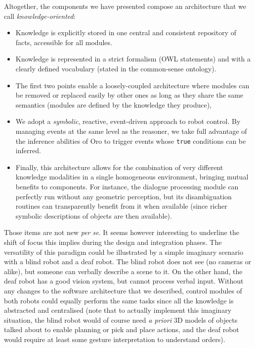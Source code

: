 \documentclass[preprint,12pt]{elsarticle}
\begin{document}
Altogether, the components we have presented compose an architecture that we
call \emph{knowledge-oriented}:

\begin{itemize}
    
    \item{Knowledge is explicitly stored in one central and consistent
    repository of facts, accessible for all modules.} 

    \item{Knowledge is represented in a strict formalism (OWL statements) and
    with a clearly defined vocabulary (stated in the common-sense ontology).}

    \item{The first two points enable a loosely-coupled architecture where
    modules can be removed or replaced easily by other ones as long as
    they share the same semantics (modules are defined by the knowledge they
    produce),} 

    \item{We adopt a \emph{symbolic}, reactive, event-driven approach to robot control.
    By managing events at the same level as the reasoner, we take full
    advantage of the inference abilities of {\sc Oro} to trigger events whose
    \texttt{true} conditions can be inferred.} 

    \item{Finally, this architecture allows for the combination of very
    different knowledge modalities in a single homogeneous environment,
    bringing mutual benefits to components. For instance, the dialogue
    processing module can perfectly run without any geometric
    perception, but its disambiguation routines can transparently
    benefit from it when available (since richer symbolic descriptions of
    objects are then available).}

\end{itemize}

Those items are not new \emph{per se}. It seems however interesting to
underline the shift of focus this implies during the design and integration
phases. The
versatility of this paradigm could be illustrated by a simple imaginary
scenario with a blind robot and a deaf robot. The blind robot does not see (no
cameras or alike), but someone can verbally describe a scene to it. On the
other hand, the deaf robot has a good vision system, but cannot process verbal
input.  Without any changes to the software architecture that we described,
control modules of both robots could equally perform the same tasks since all
the knowledge is abstracted and centralised (note that to actually implement
this imaginary situation, the blind robot would of course need \textit{a
priori} 3D models of objects talked about to enable planning or pick and place
actions, and the deaf robot would require at least some gesture interpretation
to understand orders).
\end{document}

